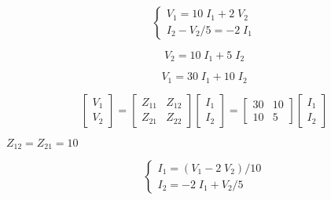{\newpage\clearpage
{}%
\begin{displaymath}	\left\{ \begin{array}{l} 
	V_1=10\;I_1+2\;V_2 \\I_2-V_2/5=-2\;I_1 \end{array} \right. \end{displaymath}%
\lthtmldisplayZ
\lthtmlcheckvsize\clearpage}

{\newpage\clearpage
{}%
\begin{displaymath}	V_2=10\;I_1+5\;I_2	\end{displaymath}%
\lthtmldisplayZ
\lthtmlcheckvsize\clearpage}

{\newpage\clearpage
{}%
\begin{displaymath}	V_1=30\;I_1+10\;I_2	\end{displaymath}%
\lthtmldisplayZ
\lthtmlcheckvsize\clearpage}

{\newpage\clearpage
{}%
\begin{displaymath}	\left[ \begin{array}{l} V_1 \\V_2 \end{array} \right]=
	\left[ \begin{array}{rr} Z_{11} & Z_{12} \\Z_{21} & Z_{22} \end{array} \right]
	\left[ \begin{array}{l} I_1 \\I_2 \end{array} \right]
=	\left[ \begin{array}{rr} 30 & 10 \\10 & 5 \end{array} \right]
	\left[ \begin{array}{l} I_1 \\I_2 \end{array} \right]
\end{displaymath}%
\lthtmldisplayZ
\lthtmlcheckvsize\clearpage}

{\newpage\clearpage
{}%
$Z_{12}=Z_{21}=10$%
\lthtmlinlinemathZ
\lthtmlcheckvsize\clearpage}

{\newpage\clearpage
{}%
\begin{displaymath}	\left\{ \begin{array}{l} 
	I_1=(V_1-2\;V_2)/10 \\I_2=-2\;I_1+V_2/5 \end{array} \right. \end{displaymath}%
\lthtmldisplayZ
\lthtmlcheckvsize\clearpage}

